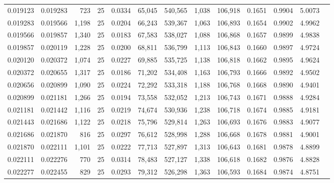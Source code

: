 \begin{tabular}{rrrrrrrrrrrrr}
0.019123 & 0.019283 &   723 &  25 &                                     0.0334 &  65,045 & 540,565 &   1,038 & 106,918 & 0.1651 & 0.9904 & 5.0073 \\
0.019283 & 0.019566 & 1,198 &  25 &                                     0.0204 &  66,243 & 539,367 &   1,063 & 106,893 & 0.1654 & 0.9902 & 4.9962 \\
0.019566 & 0.019857 & 1,340 &  25 &                                     0.0183 &  67,583 & 538,027 &   1,088 & 106,868 & 0.1657 & 0.9899 & 4.9838 \\
0.019857 & 0.020119 & 1,228 &  25 &                                     0.0200 &  68,811 & 536,799 &   1,113 & 106,843 & 0.1660 & 0.9897 & 4.9724 \\
0.020120 & 0.020372 & 1,074 &  25 &                                     0.0227 &  69,885 & 535,725 &   1,138 & 106,818 & 0.1662 & 0.9895 & 4.9624 \\
0.020372 & 0.020655 & 1,317 &  25 &                                     0.0186 &  71,202 & 534,408 &   1,163 & 106,793 & 0.1666 & 0.9892 & 4.9502 \\
0.020656 & 0.020899 & 1,090 &  25 &                                     0.0224 &  72,292 & 533,318 &   1,188 & 106,768 & 0.1668 & 0.9890 & 4.9401 \\
0.020899 & 0.021181 & 1,266 &  25 &                                     0.0194 &  73,558 & 532,052 &   1,213 & 106,743 & 0.1671 & 0.9888 & 4.9284 \\
0.021181 & 0.021442 & 1,116 &  25 &                                     0.0219 &  74,674 & 530,936 &   1,238 & 106,718 & 0.1674 & 0.9885 & 4.9181 \\
0.021443 & 0.021686 & 1,122 &  25 &                                     0.0218 &  75,796 & 529,814 &   1,263 & 106,693 & 0.1676 & 0.9883 & 4.9077 \\
0.021686 & 0.021870 &   816 &  25 &                                     0.0297 &  76,612 & 528,998 &   1,288 & 106,668 & 0.1678 & 0.9881 & 4.9001 \\
0.021870 & 0.022111 & 1,101 &  25 &                                     0.0222 &  77,713 & 527,897 &   1,313 & 106,643 & 0.1681 & 0.9878 & 4.8899 \\
0.022111 & 0.022276 &   770 &  25 &                                     0.0314 &  78,483 & 527,127 &   1,338 & 106,618 & 0.1682 & 0.9876 & 4.8828 \\
0.022277 & 0.022455 &   829 &  25 &                                     0.0293 &  79,312 & 526,298 &   1,363 & 106,593 & 0.1684 & 0.9874 & 4.8751 \\

\end{tabular}
